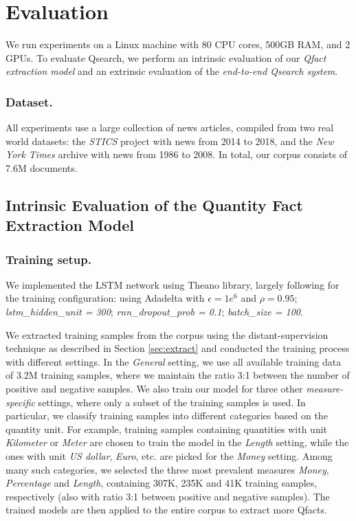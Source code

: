 
\section{Evaluation}
We run experiments on a Linux machine with 80 CPU cores, 500GB RAM, and 2 GPUs. To evaluate Qsearch, we perform an intrinsic evaluation of our {\em Qfact extraction model} and an extrinsic evaluation of the {\em end-to-end Qsearch system}.
\subsubsection{Dataset.} All experiments use a large collection of news articles, compiled from two real world datasets: the \textit{STICS} project \cite{DBLP:conf/sigir/HoffartMW14} with news from 2014 to 2018, 
and the \textit{New York Times} archive
\cite{nyt}
with news from 1986 to 2008.
In total, our corpus consists of 7.6M documents.
 
\subsection{Intrinsic Evaluation of the Quantity Fact Extraction Model}
\subsubsection{Training setup.}
We implemented the  LSTM network using Theano library,
largely following \cite{DBLP:conf/acl/HeLLZ17a} for the training 
configuration: using Adadelta with $\epsilon = 1e^6$ and $\rho = 0.95$;  \textit{lstm\_hidden\_unit = 300}; \textit{rnn\_dropout\_prob = 0.1}; \textit{batch\_size = 100}.

We extracted training samples from the corpus using the distant-supervision technique as described in Section \ref{sec:extract} and conducted the training process with different settings. 
In the \textit{General} setting, we use all available training data
of 3.2M training samples, where we maintain the ratio 3:1 between the number of positive and negative samples.
We also train our model for three other 
\textit{measure-specific} settings, where only a subset of the training samples is used. In particular, we classify training samples into different categories based on the quantity unit. For example, training samples containing quantities with unit \textit{Kilometer} or \textit{Meter} are chosen to train the model in the \textit{Length} setting, while the ones with unit \textit{US dollar}, \textit{Euro}, etc. are picked for the \textit{Money} setting. 
Among many such categories, we selected the three most prevalent measures \textit{Money}, \textit{Percentage} and \textit{Length}, containing 307K, 235K and 41K training samples, respectively (also with ratio 3:1  between positive and negative samples). 
The trained models are then applied to the entire corpus to extract more Qfacts. 

